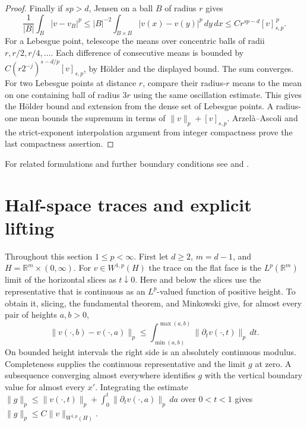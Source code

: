 \documentclass[11pt,oneside,openany]{book}
\theoremstyle{definition}
\theoremstyle{remark}
\begin{document}
\begin{proof}
Finally if \(sp>d\), Jensen on a ball \(B\) of radius \(r\) gives
\[
 \frac{1}{|B|}\int_B |v-v_B|^p
 \le |B|^{-2}\int_{B\times B}|v(x)-v(y)|^p\,dy\,dx
 \le C r^{sp-d}[v]_{s,p}^{\,p}.
\]
For a Lebesgue point, telescope the means over concentric balls
of radii \(r, r/2,r/4,\ldots\). Each difference of consecutive
means is bounded by \(C(r2^{-j})^{s-d/p}[v]_{s,p}\), by
H\"older and the displayed bound. The sum converges. For two
Lebesgue points at distance \(r\), compare their radius-\(r\)
means to the mean on one containing ball of radius \(3r\) using
the same oscillation estimate. This gives the H\"older bound and
extension from the dense set of Lebesgue points. A radius-one
mean bounds the supremum in terms of \(\|v\|_p+[v]_{s,p}\).
Arzel\`a--Ascoli and the strict-exponent interpolation argument
from integer compactness prove the last compactness assertion.
\end{proof}
For related formulations and further boundary conditions see
\cite[Sections 2--3 and 5--8]{dnpv} and
\cite[Chapter 7]{adams}.

\section{Half-space traces and explicit lifting}

Throughout this section \(1\le p<\infty\). First let \(d\ge2\),
\(m=d-1\), and \(H=\mathbb R^m\times(0,\infty)\).
For \(v\in W^{1,p}(H)\) the trace on the flat face is the
\(L^p(\mathbb R^m)\) limit of the horizontal slices as \(t\downarrow0\).
Here and below the slices use the representative that is continuous
as an \(L^p\)-valued function of positive height. To obtain it,
slicing, the fundamental theorem, and Minkowski give, for almost
every pair of heights \(a,b>0\),
\[
 \|v(\cdot,b)-v(\cdot,a)\|_p
 \le \int_{\min(a,b)}^{\max(a,b)}\|\partial_t v(\cdot,t)\|_p\,dt .
\]
On bounded height intervals the right side is an absolutely continuous
modulus. Completeness supplies the continuous representative and
the limit \(g\) at zero. A subsequence converging almost everywhere
identifies \(g\) with the vertical boundary value for almost every
\(x'\). Integrating the estimate
\(\|g\|_p\le \|v(\cdot,t)\|_p+\int_0^t
\|\partial_t v(\cdot,a)\|_p\,da\) over \(0<t<1\) gives
\(\|g\|_p\le C\|v\|_{W^{1,p}(H)}\).
\end{document}
